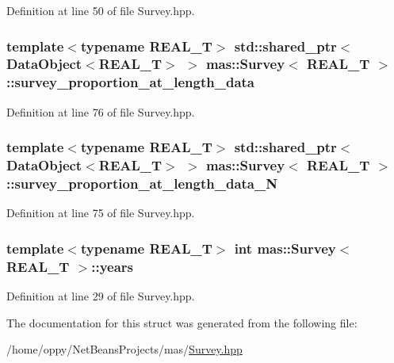 Definition at line 50 of file Survey.\-hpp.

\hypertarget{structmas_1_1_survey_a12418ba69c060c3778d723ad162dd1ba}{
\subsubsection[{survey\-\_\-proportion\-\_\-at\-\_\-length\-\_\-data}]{\setlength{\rightskip}{0pt plus 5cm}template$<$typename R\-E\-A\-L\-\_\-\-T$>$ std\-::shared\-\_\-ptr$<${\bf Data\-Object}$<$R\-E\-A\-L\-\_\-\-T$>$ $>$ {\bf mas\-::\-Survey}$<$ R\-E\-A\-L\-\_\-\-T $>$\-::survey\-\_\-proportion\-\_\-at\-\_\-length\-\_\-data}}\label{structmas_1_1_survey_a12418ba69c060c3778d723ad162dd1ba}


Definition at line 76 of file Survey.\-hpp.

\hypertarget{structmas_1_1_survey_a0b400422f471584cfb574d98fe54a5cc}{
\subsubsection[{survey\-\_\-proportion\-\_\-at\-\_\-length\-\_\-data\-\_\-\-N}]{\setlength{\rightskip}{0pt plus 5cm}template$<$typename R\-E\-A\-L\-\_\-\-T$>$ std\-::shared\-\_\-ptr$<${\bf Data\-Object}$<$R\-E\-A\-L\-\_\-\-T$>$ $>$ {\bf mas\-::\-Survey}$<$ R\-E\-A\-L\-\_\-\-T $>$\-::survey\-\_\-proportion\-\_\-at\-\_\-length\-\_\-data\-\_\-\-N}}\label{structmas_1_1_survey_a0b400422f471584cfb574d98fe54a5cc}


Definition at line 75 of file Survey.\-hpp.

\hypertarget{structmas_1_1_survey_a62db9142400baea1e578c34ffa423d97}{
\subsubsection[{years}]{\setlength{\rightskip}{0pt plus 5cm}template$<$typename R\-E\-A\-L\-\_\-\-T$>$ int {\bf mas\-::\-Survey}$<$ R\-E\-A\-L\-\_\-\-T $>$\-::years}}\label{structmas_1_1_survey_a62db9142400baea1e578c34ffa423d97}


Definition at line 29 of file Survey.\-hpp.



The documentation for this struct was generated from the following file\-:\begin{DoxyCompactItemize}
\item 
/home/oppy/\-Net\-Beans\-Projects/mas/\hyperlink{_survey_8hpp}{Survey.\-hpp}\end{DoxyCompactItemize}
